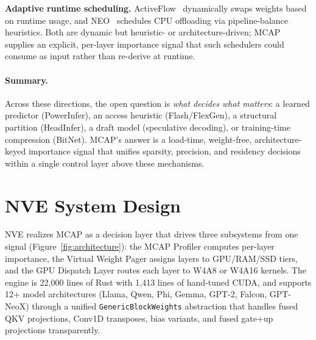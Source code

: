 \documentclass{article}
\begin{document}
\textbf{Adaptive runtime scheduling.}
ActiveFlow~\cite{zhang2025activeflow} dynamically swaps weights based on runtime
usage, and NEO~\cite{jiang2025neo} schedules CPU offloading via pipeline-balance
heuristics. Both are dynamic but heuristic- or architecture-driven; MCAP supplies
an explicit, per-layer importance signal that such schedulers could consume as
input rather than re-derive at runtime.

\paragraph{Summary.} Across these directions, the open question is
\emph{what decides what matters}: a learned predictor (PowerInfer), an
access heuristic (Flash/FlexGen), a structural partition (HeadInfer), a
draft model (speculative decoding), or training-time compression
(BitNet). MCAP's answer is a load-time, weight-free, architecture-keyed
importance signal that unifies sparsity, precision, and residency
decisions within a single control layer above these mechanisms.


\section{NVE System Design}
\label{sec:system}

NVE realizes MCAP as a decision layer that drives three subsystems from one signal
(Figure~\ref{fig:architecture}): the MCAP Profiler computes per-layer importance, the
Virtual Weight Pager assigns layers to GPU/RAM/SSD tiers, and the GPU Dispatch Layer
routes each layer to W4A8 or W4A16 kernels. The engine is 22,000 lines of Rust with
1,413 lines of hand-tuned CUDA, and supports 12+ model architectures (Llama, Qwen, Phi,
Gemma, GPT-2, Falcon, GPT-NeoX) through a unified \texttt{GenericBlockWeights}
abstraction that handles fused QKV projections, Conv1D transposes, bias variants, and
fused gate+up projections transparently.
\end{document}
